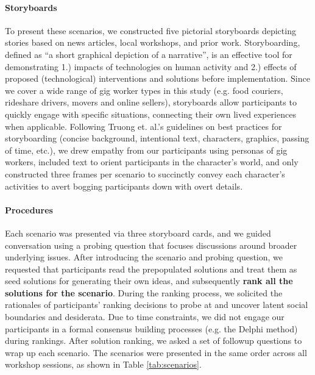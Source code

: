 \paragraph{Storyboards} To present these scenarios, we constructed five pictorial storyboards depicting stories based on news articles, local workshops, and prior work. Storyboarding, defined as ``a short graphical depiction of a narrative'', is an effective tool for demonstrating 1.) impacts of technologies on human activity and 2.) effects of proposed (technological) interventions and solutions before implementation. Since we cover a wide range of gig worker types in this study (e.g. food couriers, rideshare drivers, movers and online sellers), storyboards allow participants to quickly engage with specific situations, connecting their own lived experiences when applicable. 
Following  Truong et. al.'s guidelines \cite{truong2006storyboarding} on best practices for storyboarding (concise background, intentional text, characters, graphics, passing of time, etc.), we drew empathy from our participants using personas of gig workers, included text to orient participants in the character's world, and only constructed three frames per scenario to succinctly convey each character's activities to avert bogging participants down with overt details.

\paragraph{Procedures}
Each scenario was presented via three storyboard cards, and we guided conversation using a probing question that focuses discussions around broader underlying issues. 
After introducing the scenario and probing question, we requested that participants read the prepopulated solutions and treat them as seed solutions for generating their own ideas, and subsequently \textbf{rank all the solutions for the scenario}. 
During the ranking process, we solicited the rationales of participants' ranking decisions to probe at and uncover latent social boundaries and desiderata. Due to time constraints, we did not engage our participants in a formal consensus building processes (e.g. the Delphi method) during rankings. After solution ranking, we asked a set of followup questions to wrap up each scenario. The scenarios were presented in the same order across all workshop sessions, as shown in Table \ref{tab:scenarios}.

